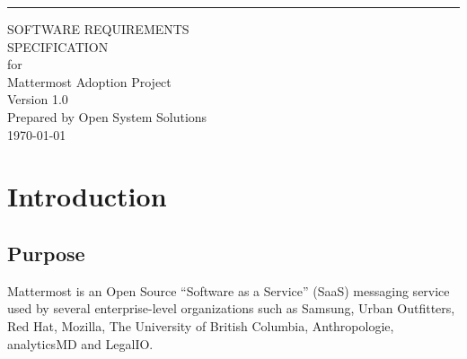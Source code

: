 \documentclass{scrreprt}
\date{}
\def\myversion{1.0 }
\begin{document}
\begin{flushright}
    \rule{16cm}{5pt}\vskip1cm
    \begin{bfseries}
        \Huge{SOFTWARE REQUIREMENTS\\ SPECIFICATION}\\
        \vspace{1.9cm}
        for\\
        \vspace{1.9cm}
        Mattermost Adoption Project\\
        \vspace{1.9cm}
        \LARGE{Version \myversion}\\
        \vspace{1.9cm}
        Prepared by Open System Solutions\\
        \vspace{1.9cm}
        \today\\
    \end{bfseries}
\end{flushright}

\tableofcontents


%

\chapter{Introduction}

\section{Purpose}
Mattermost is an Open Source ``Software as a Service'' (SaaS) messaging service used
by several enterprise-level organizations such as Samsung, Urban Outfitters,
Red Hat, Mozilla, The University of British Columbia, Anthropologie, analyticsMD
and LegalIO.\\
\end{document}
